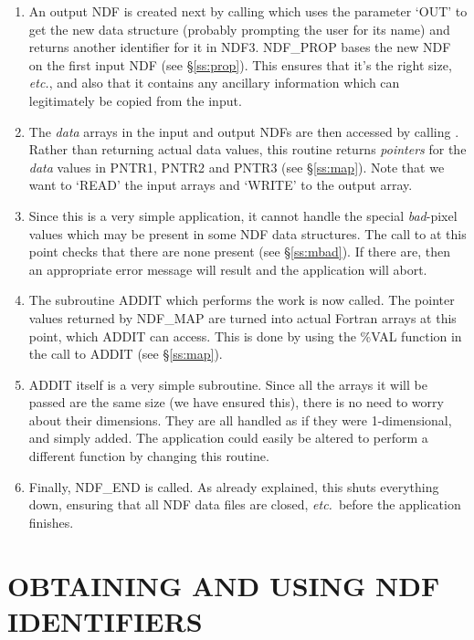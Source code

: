 \documentclass[twoside,11pt,nolof]{starlink}
\providecommand{\st}[1]{{\emph{#1}}}
\begin{document}
\begin{enumerate}
\item An output NDF is created next by calling  which uses the
parameter `OUT' to get the new data structure (probably prompting the
user for its name) and returns another identifier for it in NDF3.
NDF\_PROP bases the new NDF on the first input NDF (see \S\ref{ss:prop}).
This ensures that it's the right size, \st{etc.}, and also that it contains
any ancillary information which can legitimately be copied from the input.

\item The \st{data\/} arrays in the input and output NDFs are then accessed
by calling .
Rather than returning actual data values, this routine returns
\st{pointers\/} for the \st{data\/} values in PNTR1, PNTR2 and PNTR3
(see
\S\ref{ss:map}).
Note that we want to `READ' the input arrays and `WRITE' to the output array.

\item Since this is a very simple application, it cannot handle the special
\st{bad\/}-pixel values which may be present in some NDF data structures.
The call to  at this point checks that there are none present (see
\S\ref{ss:mbad}).
If there are, then an appropriate error message will result and the application
will abort.

\item The subroutine ADDIT which performs the work is now called.
The pointer values returned by NDF\_MAP are turned into actual Fortran
arrays at this point, which ADDIT can access.
This is done by using the \%VAL function in the call to ADDIT (see
\S\ref{ss:map}).

\item ADDIT itself is a very simple subroutine.
Since all the arrays it will be passed are the same size (we have ensured
this), there is no need to worry about their dimensions.
They are all handled as if they were 1-dimensional, and simply added.
The application could easily be altered to perform a different function by
changing this routine.

\item Finally, NDF\_END is called.
As already explained, this shuts everything down, ensuring that all NDF data
files are closed, \st{etc.}\ before the application finishes.

\end{enumerate}


\section{OBTAINING AND USING NDF IDENTIFIERS}
\end{document}
